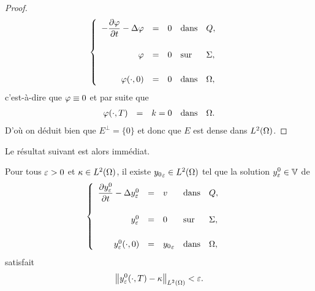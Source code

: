 \begin{proof}
\begin{equation*}
        \begin{cases}\displaystyle
            \begin{array}{rclll}
                -\dfrac{\partial{}\varphi}{\partial{}t} - \Delta\varphi & = & 0 & \text{dans} &
                Q,\\
                \\
                \varphi & = & 0 & \text{sur} & \Sigma,\\
                \\
                \varphi\!\left({\cdot,0}\right) & = & 0 & \text{dans} &
                \Omega,
            \end{array}
        \end{cases}
    \end{equation*}
    c'est-à-dire que $\varphi\equiv 0$ et par suite que
    \begin{equation*}
        \begin{array}{rclll}
            \varphi\!\left({\cdot,T}\right) & = & k = 0 & \text{dans} &
            \Omega.
        \end{array}
    \end{equation*}
    D'où on déduit bien que $E^{\perp} = \{0\}$ et donc que $E$ est dense
    dans $L^{2}\!\left({\Omega}\right)$.
\end{proof}

Le résultat suivant est alors immédiat.

\begin{corollaire}\label{coro:controllability-result-2}%
    Pour tous $\varepsilon > 0$ et $\kappa\in L^{2}\!\left({\Omega}\right)$, il existe
    ${y_{0}}_{\varepsilon}\in L^{2}\!\left({\Omega}\right)$ tel que la solution $\displaystyle
    y_{\varepsilon}^{0}\in \mathbb{V}$ de
    \begin{equation}\label{eq:controllability-result-3}
        \begin{cases}\displaystyle
            \begin{array}{rclll}
                \dfrac{\partial{}y_{\varepsilon}^{0}}{\partial{}t} - \Delta y_{\varepsilon}^{0} & = & v &
                \text{dans} & Q,\\
                \\
                y_{\varepsilon}^{0} & = & 0 & \text{sur} & \Sigma,\\
                \\
                y_{\varepsilon}^{0}\!\left({\cdot,0}\right) & = & {y_{0}}_{\varepsilon}
                & \text{dans} & \Omega,
            \end{array}
        \end{cases}
    \end{equation}
    satisfait
    \begin{equation*}\label{eq:controllability-result-4}
        {\left\|{y_{\varepsilon}^{0}\!\left({\cdot,T}\right) - \kappa }\right\|}_{L^{2}\left({\Omega}\right)} < \varepsilon.
    \end{equation*}
\end{corollaire}

